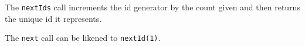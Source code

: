 The \verb+nextIds+ call increments the id generator by the count given and then returns the unique id it represents.

The \verb+next+ call can be likened to \verb+nextId(1)+.
